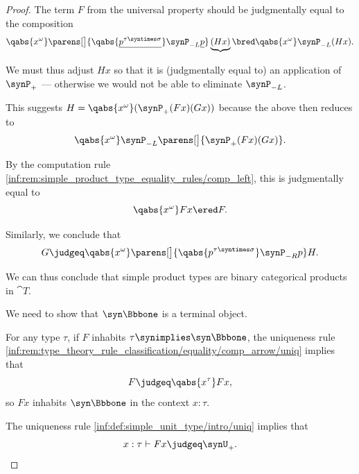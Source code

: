 \begin{proof}
   The term \( F \) from the universal property should be judgmentally equal to the composition
  \begin{equation*}
    \qabs {x^\omega} \parens[\big]{ \qabs {\underline{p^{\tau \syntimes \sigma}}} \synP_{-L} \underline{p} } \underbrace{(H x)}
    \bred
    \qabs {x^\omega} \synP_{-L} (H x).
  \end{equation*}

  We must thus adjust \( H x \) so that it is (judgmentally equal to) an application of \( \synP_+ \) --- otherwise we would not be able to eliminate \( \synP_{-L} \).

  This suggests \( H = \qabs {x^\omega} (\synP_+ (F x) (G x)) \) because the above then reduces to
  \begin{equation*}
    \qabs {x^\omega} \synP_{-L} \parens[\big]{ \synP_+ (F x) (G x) }.
  \end{equation*}

  By the computation rule \ref{inf:rem:simple_product_type_equality_rules/comp_left}, this is judgmentally equal to
  \begin{equation*}
    \qabs {x^\omega} F x \ered F.
  \end{equation*}

  Similarly, we conclude that
  \begin{equation*}
    G \judgeq \qabs {x^\omega} \parens[\big]{ \qabs {p^{\tau \syntimes \sigma}} \synP_{-R} p } H.
  \end{equation*}

  We can thus conclude that simple product types are binary categorical products in \( \cat{T} \).

   We need to show that \( \syn\Bbbone \) is a terminal object.

  For any type \( \tau \), if \( F \) inhabits \( \tau \synimplies \syn\Bbbone \), the uniqueness rule \ref{inf:rem:type_theory_rule_classification/equality/comp_arrow/uniq} implies that
  \begin{equation*}
    F \judgeq \qabs {x^\tau} F x,
  \end{equation*}
  so \( F x \) inhabits \( \syn\Bbbone \) in the context \( x: \tau \).

  The uniqueness rule \ref{inf:def:simple_unit_type/intro/uniq} implies that
  \begin{equation*}
    x: \tau \vdash F x \judgeq \synU_+.
  \end{equation*}


\end{proof}
